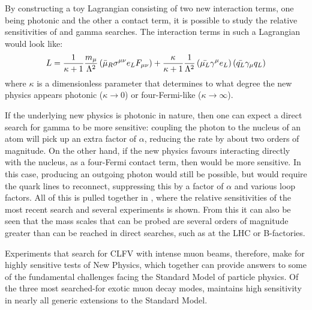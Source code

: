 By constructing a toy Lagrangian consisting of two new interaction terms, one being photonic and the other a contact term, it is possible to study the relative sensitivities of \mueconv and \mutoe gamma searches.
The interaction terms in such a Lagrangian would look like:
\begin{equation}
L=\frac{1}{\kappa+1}\frac{m_\mu}{\Lambda^2}\left(\bar{\mu}_R\sigma^{\mu\nu}e_LF_{\mu\nu}\right)+\frac{\kappa}{\kappa+1}\frac{1}{\Lambda^2}\left(\bar{\mu_L}\gamma^\mu e_L\right)\left(\bar{q_L}\gamma_\mu q_L\right)
\eqlabel{theory:toy}
\end{equation}
where $\kappa$ is a dimensionless parameter that determines to what degree the new physics appears photonic ($\kappa\rightarrow0$) or four-Fermi-like ($\kappa\rightarrow\infty$).
\FigTheoryMuecVsMueg

If the underlying new physics is photonic in nature, then one can expect a direct search for \mutoe gamma to be more sensitive: coupling the photon to the nucleus of an atom will pick up an extra factor of $\alpha$, reducing the \mueconv rate by about two orders of magnitude.
On the other hand, if the new physics favours interacting directly with the nucleus, as a four-Fermi contact term, then \mueconv would be more sensitive. 
In this case, producing an outgoing photon would still be possible, but would require the quark lines to reconnect, suppressing this by a factor of $\alpha$ and various loop factors.
All of this is pulled together in , where the relative sensitivities of the most recent \muegamma search and several \mueconv experiments is shown.
From this it can also be seen that the mass scales that can be probed are several orders of magnitude greater than can be reached in direct searches, such as at the LHC or B-factories.

Experiments that search for \ac{CLFV} with intense muon beams, therefore, make for highly sensitive tests of New Physics, which together can provide answers to some of the fundamental challenges facing the Standard Model of particle physics.
Of the three most searched-for exotic muon decay modes, \mueconv maintains high sensitivity in nearly all generic extensions to the Standard Model.
